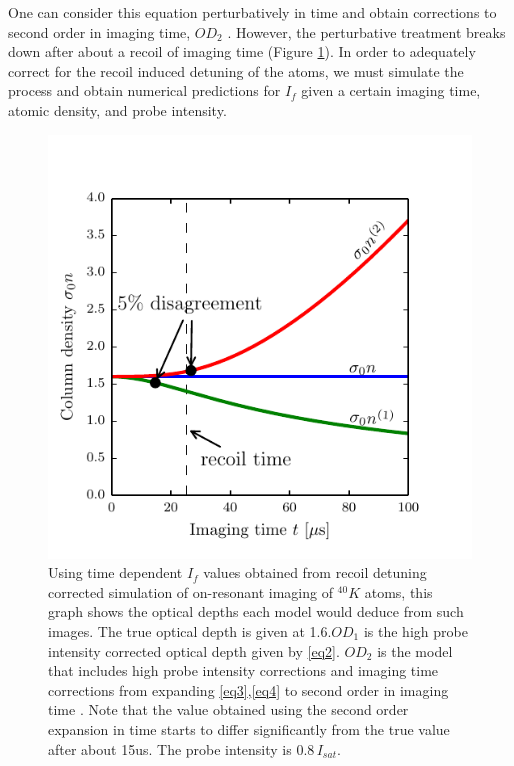 \documentclass[12pt]{iopart}
\begin{document}
\par One can consider this equation perturbatively in time and obtain corrections to second order in imaging time, $OD_2$  \cite{LJLthesis}. However, the perturbative treatment breaks down after about a recoil of imaging time (Figure \ref{fig:ODcorrections}). In order to adequately correct for the recoil induced detuning of the atoms, we must simulate the process and obtain numerical predictions for $I_f$ given a certain imaging time, atomic density, and probe intensity. 
\begin{figure}
	\includegraphics[scale=0.57]{figure2}
\caption{Using time dependent $I_f$ values obtained from recoil detuning corrected simulation of on-resonant imaging of $^{40}K$ atoms, this graph shows the optical depths each model would deduce from such images. The true optical depth is given at 1.6.$OD_1$ is the high probe intensity corrected optical depth given by \ref{eq2}. $OD_2$ is the model that includes high probe intensity corrections and imaging time corrections from expanding \ref{eq3},\ref{eq4} to second order in imaging time \cite{LJLthesis}. Note that the value obtained using the second order expansion in time starts to differ significantly from the true value after about 15us. The probe intensity is $0.8\, I_{sat}$. }  
\label{fig:ODcorrections}
\end{figure}
\end{document}

